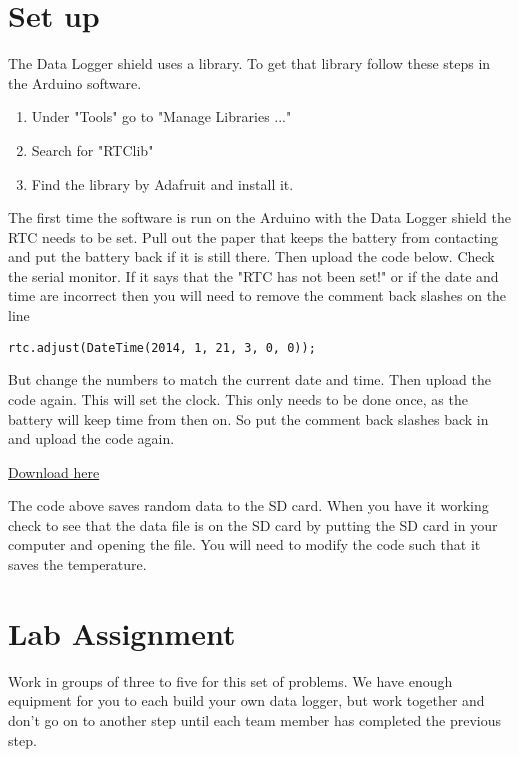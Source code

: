 \section{Set up}
	The Data Logger shield uses a library. To get that library follow these steps in the Arduino software.
	\begin{enumerate}
		\item Under "Tools" go to "Manage Libraries ..."
		\item Search for "RTClib"
		\item Find the library by Adafruit and install it.
	\end{enumerate}

    The first time the software is run on the Arduino with the Data Logger shield the RTC needs to be set.  Pull out the paper that keeps the battery from contacting and put the battery back if it is still there. Then upload the code below. Check the serial monitor. If it says that the "RTC has not been set!" or if the date and time are incorrect then you will need to remove the comment back slashes on the line 
    \begin{lstlisting}[language=Arduino]
    rtc.adjust(DateTime(2014, 1, 21, 3, 0, 0));
    \end{lstlisting}
    But change the numbers to match the current date and time. Then upload the code again. This will set the clock. This only needs to be done once, as the battery will keep time from then on. So put the comment back slashes back in and upload the code again.


\href{https://dtoliphant.github.io/PH250Manual/Code/DataLog.ino}{Download here}



The code above saves random data to the SD card. When you have it working check to see that the data file is on the SD card by putting the SD card in your computer and opening the file.  You will need to modify the code such that it saves the temperature.




\section{Lab Assignment}
	
	Work in groups of three to five for this set of problems. We have enough equipment for you to each build your own data logger, but work together and don't go on to another step until each team member has completed the previous step.
	
